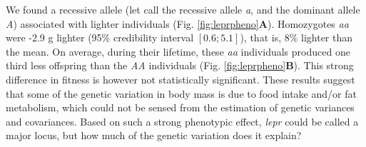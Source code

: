 We found a recessive allele (let call the recessive allele \emph{a}, and the dominant allele \emph{A}) associated with lighter individuals (Fig. \ref{fig:leprpheno}\textbf{A}). Homozygotes \emph{aa} were -2.9 g lighter (95\% credibility interval $[0.6;5.1]$), that is, 8\% lighter than the mean. On average, during their lifetime, these \emph{aa} individuals produced one third less offspring than the \emph{AA} individuals (Fig. \ref{fig:leprpheno}\textbf{B}). This strong difference in fitness is however not statistically significant. These results suggest that some of the genetic variation in body mass is due to food intake and/or fat metabolism, which could not be sensed from the estimation of genetic variances and covariances. 
Based on such a strong phenotypic effect, \emph{lepr} could be called a major locus, but how much of the genetic variation does it explain?

